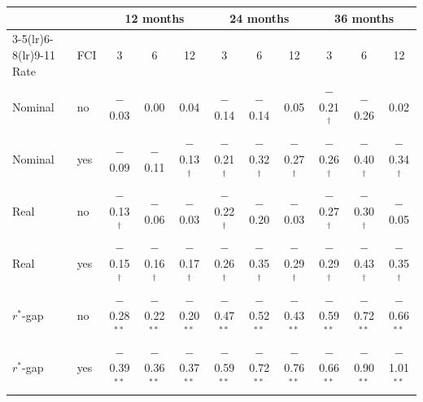 \begin{tabular}{llccccccccc}
\toprule
 & & \multicolumn{3}{c}{12 months} & \multicolumn{3}{c}{24 months} & \multicolumn{3}{c}{36 months}\\
\cmidrule(lr){3-5}\cmidrule(lr){6-8}\cmidrule(lr){9-11}
Rate & FCI & 3 & 6 & 12 & 3 & 6 & 12 & 3 & 6 & 12 \\
\midrule
Nominal & no & $-$0.03 & 0.00 & 0.04 & $-$0.14 & $-$0.14 & 0.05 & $-$0.21$^{\dagger}$ & $-$0.26 & 0.02 \\
Nominal & yes & $-$0.09 & $-$0.11 & $-$0.13$^{\dagger}$ & $-$0.21$^{\dagger}$ & $-$0.32$^{\dagger}$ & $-$0.27$^{\dagger}$ & $-$0.26$^{\dagger}$ & $-$0.40$^{\dagger}$ & $-$0.34$^{\dagger}$ \\
\midrule
Real & no & $-$0.13$^{\dagger}$ & $-$0.06 & $-$0.03 & $-$0.22$^{\dagger}$ & $-$0.20 & $-$0.03 & $-$0.27$^{\dagger}$ & $-$0.30$^{\dagger}$ & $-$0.05 \\
Real & yes & $-$0.15$^{\dagger}$ & $-$0.16$^{\dagger}$ & $-$0.17$^{\dagger}$ & $-$0.26$^{\dagger}$ & $-$0.35$^{\dagger}$ & $-$0.29$^{\dagger}$ & $-$0.29$^{\dagger}$ & $-$0.43$^{\dagger}$ & $-$0.35$^{\dagger}$ \\
\midrule
$r^*$-gap & no & $-$0.28$^{**}$ & $-$0.22$^{**}$ & $-$0.20$^{**}$ & $-$0.47$^{**}$ & $-$0.52$^{**}$ & $-$0.43$^{**}$ & $-$0.59$^{**}$ & $-$0.72$^{**}$ & $-$0.66$^{**}$ \\
$r^*$-gap & yes & $-$0.39$^{**}$ & $-$0.36$^{**}$ & $-$0.37$^{**}$ & $-$0.59$^{**}$ & $-$0.72$^{**}$ & $-$0.76$^{**}$ & $-$0.66$^{**}$ & $-$0.90$^{**}$ & $-$1.01$^{**}$ \\
\bottomrule
\end{tabular}
